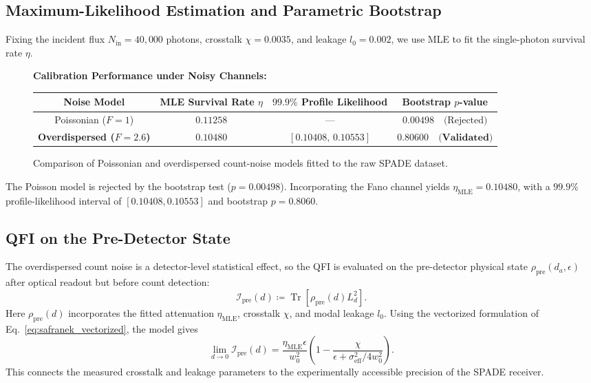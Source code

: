 \subsection{Maximum-Likelihood Estimation and Parametric Bootstrap}

Fixing the incident flux $N_{\text{in}} = 40{,}000$ photons, crosstalk $\chi = 0.0035$, and leakage $l_0 = 0.002$, we use MLE to fit the single-photon survival rate $\eta$.

\begin{figure}[H]
    \centering
    \begin{center}
        \textbf{Calibration Performance under Noisy Channels:}
        \begin{tabular}{cccc}
            \hline\hline
            \textbf{Noise Model}               & \textbf{MLE Survival Rate $\eta$} & \textbf{$99.9\%$ Profile Likelihood} & \textbf{Bootstrap $p$-value}                \\
            \hline
            Poissonian ($F = 1$)               & $0.11258$                         & ---                                  & $0.00498 \quad \text{(Rejected)}$           \\
            \textbf{Overdispersed ($F = 2.6$)} & $\mathbf{0.10480}$                & $\mathbf{[0.10408, \, 0.10553]}$     & $\mathbf{0.80600 \quad \text{(Validated)}}$ \\
            \hline\hline
        \end{tabular}
    \end{center}
    \caption{Comparison of Poissonian and overdispersed count-noise models fitted to the raw SPADE dataset.}
    \label{fig:mle_bootstrap_table}
\end{figure}

The Poisson model is rejected by the bootstrap test ($p=0.00498$). Incorporating the Fano channel yields $\eta_{\text{MLE}} = 0.10480$, with a $99.9\%$ profile-likelihood interval of $[0.10408, 0.10553]$ and bootstrap $p=0.8060$.

\subsection{QFI on the Pre-Detector State}

The overdispersed count noise is a detector-level statistical effect, so the QFI is evaluated on the pre-detector physical state $\rho_{\text{pre}}(d_a, \epsilon)$ after optical readout but before count detection:
\begin{equation}
    \mathcal{I}_{\text{pre}}(d) \coloneqq \operatorname{Tr}\left[ \rho_{\text{pre}}(d) L_d^2 \right].
    \label{eq:qfi_pre_detector}
\end{equation}
Here $\rho_{\text{pre}}(d)$ incorporates the fitted attenuation $\eta_{\text{MLE}}$, crosstalk $\chi$, and modal leakage $l_0$. Using the vectorized formulation of Eq.~\eqref{eq:safranek_vectorized}, the model gives
\begin{equation}
    \lim_{d \to 0} \mathcal{I}_{\text{pre}}(d) = \frac{\eta_{\text{MLE}} \epsilon}{w_0^2} \left( 1 - \frac{\chi}{\epsilon + \sigma^2_{\text{eff}}/4w_0^2} \right).
\end{equation}
This connects the measured crosstalk and leakage parameters to the experimentally accessible precision of the SPADE receiver.
